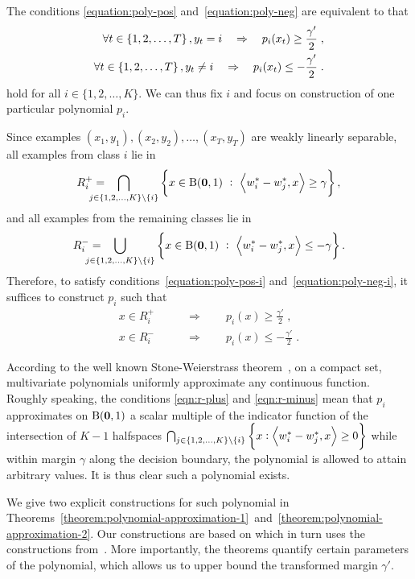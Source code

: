 The conditions \eqref{equation:poly-pos} and~\eqref{equation:poly-neg} are
equivalent to that
\begin{align}
\label{equation:poly-pos-i}
\forall t \in \cbr{1,2,\dots,T}, y_t = i \quad \Rightarrow \quad p_i(x_t) \ge \frac{\gamma'}{2} \; , \\
\label{equation:poly-neg-i}
\forall t \in \cbr{1,2,\dots,T}, y_t \neq i \quad \Rightarrow \quad p_i(x_t) \le -\frac{\gamma'}{2} \; .
\end{align}
hold for all $i \in \{1,2,\dots,K\}$. We can thus fix $i$ and focus on
construction of one particular polynomial $p_i$.

Since examples $(x_1,y_1), (x_2, y_2), \dots, (x_T,y_T)$ are weakly linearly separable,
all examples from class $i$ lie in
$$
R_i^+ = \!\!\!\!\! \!\!\!\!\! \bigcap_{j \in \cbr{1,2,\dots,K} \setminus \cbr{i}} \cbr{x \in \B(\zero,1) ~:~ \ip{w_i^* - w_j^*}{x} \ge \gamma},
$$
and all examples from the remaining classes lie in
$$
R_i^- = \!\!\!\!\! \!\!\!\!\! \bigcup_{j \in \cbr{1,2,\dots,K} \setminus \cbr{i}} \cbr{x \in \B(\zero,1) ~:~ \ip{w_i^* - w_j^*}{x} \le -\gamma}.
$$
Therefore, to satisfy conditions~\eqref{equation:poly-pos-i}
and~\eqref{equation:poly-neg-i}, it suffices to construct $p_i$ such that
\begin{align}
\label{eqn:r-plus}
x \in R_i^+ \qquad & \Longrightarrow \qquad p_i(x) \ge \frac {\gamma'} 2 \; , \\
\label{eqn:r-minus}
x \in R_i^- \qquad & \Longrightarrow \qquad p_i(x) \le - \frac {\gamma'} 2 \; .
\end{align}

According to the well known Stone-Weierstrass theorem~\citep[see
e.g.][Section~10.10]{Davidson-Donsig-2010}, on a compact set, multivariate
polynomials uniformly approximate any continuous function. Roughly speaking, the
conditions \eqref{eqn:r-plus} and \eqref{eqn:r-minus} mean that $p_i$
approximates on $\operatorname{B}(\mathbf{0},1)$ a scalar multiple of the indicator function of the
intersection of $K-1$ halfspaces $\bigcap_{j \in \cbr{1,2,\dots,K} \setminus
\cbr{i}} \cbr{x: \ip{w_i^* - w_j^*}{x} \geq 0}$ while within margin $\gamma$ along
the decision boundary, the polynomial is allowed to attain arbitrary values.
It is thus clear such a polynomial exists.

We give two explicit constructions for such polynomial in
Theorems~\ref{theorem:polynomial-approximation-1}~and~\ref{theorem:polynomial-approximation-2}.
Our constructions are based on \citet{Klivans-Servedio-2008} which in turn uses
the constructions from~\citet{Beigel-Reingold-Spielman-1995}. More importantly,
the theorems quantify certain parameters of the polynomial, which allows us
to upper bound the transformed margin $\gamma'$.

